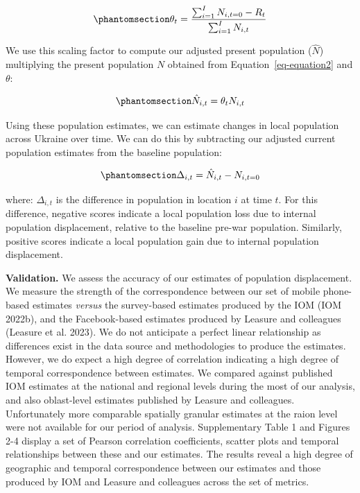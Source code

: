 \documentclass[
  sn-nature,
  11pt,
]{sn-jnl}
\begin{document}
\begin{equation}\phantomsection\label{eq-equation3}{ \theta_{t} = \frac{\sum_{i=1}^I N_{i,t=0} - R_{t}}{\sum_{i=1}^I N_{i,t}} }\end{equation}

We use this scaling factor to compute our adjusted present population
(\(\hat{N}\)) multiplying the present population \(N\) obtained from
Equation~\ref{eq-equation2} and \(\theta\):

\begin{equation}\phantomsection\label{eq-equation4}{ \hat{N}_{i,t} = \theta_{t} N_{i,t} }\end{equation}

Using these population estimates, we can estimate changes in local
population across Ukraine over time. We can do this by subtracting our
adjusted current population estimates from the baseline population:

\begin{equation}\phantomsection\label{eq-equation5}{ \Delta_{i,t} = \hat{N}_{i,t} - N_{i,t=0}}\end{equation}

where: \(\Delta_{i,t}\) is the difference in population in location
\(i\) at time \(t\). For this difference, negative scores indicate a
local population loss due to internal population displacement, relative
to the baseline pre-war population. Similarly, positive scores indicate
a local population gain due to internal population displacement.

\textbf{Validation.} We assess the accuracy of our estimates of
population displacement. We measure the strength of the correspondence
between our set of mobile phone-based estimates \emph{versus} the
survey-based estimates produced by the IOM (IOM 2022b), and the
Facebook-based estimates produced by Leasure and colleagues (Leasure et
al. 2023). We do not anticipate a perfect linear relationship as
differences exist in the data source and methodologies to produce the
estimates. However, we do expect a high degree of correlation indicating
a high degree of temporal correspondence between estimates. We compared
against published IOM estimates at the national and regional levels
during the most of our analysis, and also oblast-level estimates
published by Leasure and colleagues. Unfortunately more comparable
spatially granular estimates at the raion level were not available for
our period of analysis. Supplementary Table 1 and Figures 2-4 display a
set of Pearson correlation coefficients, scatter plots and temporal
relationships between these and our estimates. The results reveal a high
degree of geographic and temporal correspondence between our estimates
and those produced by IOM and Leasure and colleagues across the set of
metrics.
\end{document}
